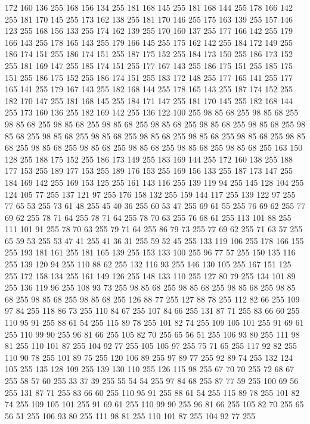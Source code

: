 172 160 136 255 168 156 134 255 181 168 145 255 181 168 144 255 178 166 142 255 181 170 145 255 173 162 138 255 181 170 146 255 175 163 139 255 157 146 123 255 168 156 133 255 174 162 139 255 170 160 137 255 177 166 142 255 179 166 143 255 178 165 143 255 179 166 145 255 175 162 142 255 184 172 149 255 186 174 151 255 186 174 151 255 187 175 152 255 184 173 150 255 186 173 152 255 181 169 147 255 185 174 151 255 177 167 143 255 186 175 151 255 185 175 151 255 186 175 152 255 186 174 151 255 183 172 148 255 177 165 141 255 177 165 141 255 179 167 143 255 182 168 144 255 178 165 143 255 187 174 152 255 182 170 147 255 181 168 145 255 184 171 147 255 181 170 145 255 182 168 144 255 173 160 136 255 182 169 142 255 136 122 100 255 98 85 68 255 98 85 68 255 98 85 68 255 98 85 68 255 98 85 68 255 98 85 68 255 98 85 68 255 98 85 68 255 98 85 68 255 98 85 68 255 98 85 68 255 98 85 68 255 98 85 68 255 98 85 68 255 98 85 68 255 98 85 68 255 98 85 68 255 98 85 68 255
98 85 68 255 98 85 68 255 163 150 128 255 188 175 152 255 186 173 149 255 183 169 144 255 172 160 138 255 188 177 153 255 189 177 153 255 189 176 153 255 169 156 133 255 187 173 147 255 184 169 142 255 169 153 125 255 161 143 116 255 139 119 94 255 145 128 104 255 124 105 77 255 137 121 97 255 176 158 132 255 159 144 117 255 139 122 97 255 77 65 53 255 73 61 48 255 45 40 36 255 60 53 47 255 69 61 55 255 76 69 62 255 77 69 62 255 78 71 64 255 78 71 64 255 78 70 63 255 76 68 61 255 113 101 88 255 111 101 91 255 78 70 63 255 79 71 64 255 86 79 73 255 77 69 62 255 71 63 57 255 65 59 53 255 53 47 41 255 41 36 31 255 59 52 45 255 133 119 106 255 178 166 155 255 193 181 161 255 181 165 139 255 153 133 100 255 96 77 57 255 150 135 116 255 139 120 94 255 110 88 62 255 132 116 93 255 146 130 105 255 167 151 125 255 172 158 134 255 161 149 126 255 148 133 110 255 127 80 79 255 134 101 89 255 136 119 96 255 108 93 73 255 98 85 68 255
98 85 68 255 98 85 68 255 98 85 68 255 98 85 68 255 98 85 68 255 126 88 77 255 127 88 78 255 112 82 66 255 109 97 84 255 118 86 73 255 110 84 67 255 107 84 66 255 131 87 71 255 83 66 60 255 110 95 91 255 88 61 54 255 115 89 78 255 101 82 74 255 109 105 101 255 91 69 61 255 110 99 90 255 96 81 66 255 105 82 70 255 65 56 51 255 106 93 80 255 111 98 81 255 110 101 87 255 104 92 77 255 105 105 97 255 75 71 65 255 117 92 82 255 110 90 78 255 101 89 75 255 120 106 89 255 97 89 77 255 92 89 74 255 132 124 105 255 135 128 109 255 139 130 110 255 126 115 98 255 67 70 70 255 72 68 67 255 58 57 60 255 33 37 39 255 55 54 54 255 97 84 68 255 87 77 59 255 100 69 56 255 131 87 71 255 83 66 60 255 110 95 91 255 88 61 54 255 115 89 78 255 101 82 74 255 109 105 101 255 91 69 61 255 110 99 90 255 96 81 66 255 105 82 70 255 65 56 51 255 106 93 80 255 111 98 81 255 110 101 87 255 104 92 77 255
